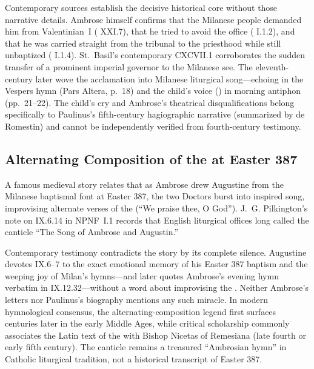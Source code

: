 Contemporary sources establish the decisive historical core without those narrative details. Ambrose himself confirms that the Milanese people demanded him from Valentinian~I ( XXI.7), that he tried to avoid the office ( I.1.2), and that he was carried straight from the tribunal to the priesthood while still unbaptized ( I.1.4). St.~Basil's contemporary  CXCVII.1 corroborates the sudden transfer of a prominent imperial governor to the Milanese see. The eleventh-century  later wove the acclamation into Milanese liturgical song---echoing  in the Vespers hymn  (Pars Altera, p.~18) and the child's voice () in morning antiphon  (pp.~21--22). The child's cry and Ambrose's theatrical disqualifications belong specifically to Paulinus's fifth-century hagiographic narrative (summarized by de Romestin) and cannot be independently verified from fourth-century testimony.

\subsection{Alternating Composition of the  at Easter 387}

A famous medieval story relates that as Ambrose drew Augustine from the Milanese baptismal font at Easter 387, the two Doctors burst into inspired song, improvising alternate verses of the  (``We praise thee, O God''). J.~G. Pilkington's note on  IX.6.14 in NPNF~I.1 records that English liturgical offices long called the canticle ``The Song of Ambrose and Augustin.''

Contemporary testimony contradicts the story by its complete silence. Augustine devotes  IX.6--7 to the exact emotional memory of his Easter 387 baptism and the weeping joy of Milan's hymns---and later quotes Ambrose's evening hymn  verbatim in IX.12.32---without a word about improvising the . Neither Ambrose's letters nor Paulinus's biography mentions any such miracle. In modern hymnological consensus, the alternating-composition legend first surfaces centuries later in the early Middle Ages, while critical scholarship commonly associates the Latin text of the  with Bishop Nicetas of Remesiana (late fourth or early fifth century). The canticle remains a treasured ``Ambrosian hymn'' in Catholic liturgical tradition, not a historical transcript of Easter 387.

